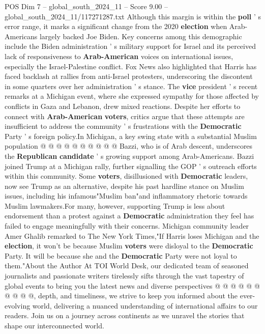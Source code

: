 \begin{textsample}{POS Dim 7 – global\_south\_2024\_11 – Score 9.00 – global\_south\_2024\_11/117271287.txt}
Although this margin is within the \textbf{poll} ' s error range, it marks a significant change from the 2020 \textbf{election} when Arab-Americans largely backed Joe Biden.
Key concerns among this demographic include the Biden administration ' s military support for Israel and its perceived lack of responsiveness to \textbf{Arab-American} voices on international issues, especially the Israel-Palestine conflict.
Fox News also highlighted that Harris has faced backlash at rallies from anti-Israel protesters, underscoring the discontent in some quarters over her administration ' s stance.
The \textbf{vice} president ' s recent remarks at a Michigan event, where she expressed sympathy for those affected by conflicts in Gaza and Lebanon, drew mixed reactions.
Despite her efforts to connect with \textbf{Arab-American} \textbf{voters}, critics argue that these attempts are insufficient to address the community ' s frustrations with the \textbf{Democratic} Party ' s foreign policy.In Michigan, a key swing state with a substantial Muslim population @ @ @ @ @ @ @ @ @ @ Bazzi, who is of Arab descent, underscores the \textbf{Republican} \textbf{candidate} ' s growing support among Arab-Americans.
Bazzi joined Trump at a Michigan rally, further signalling the GOP ' s outreach efforts within this community.
Some \textbf{voters}, disillusioned with \textbf{Democratic} leaders, now see Trump as an alternative, despite his past hardline stance on Muslim issues, including his infamous"Muslim ban"and inflammatory rhetoric towards Muslim lawmakers.For many, however, supporting Trump is less about endorsement than a protest against a \textbf{Democratic} administration they feel has failed to engage meaningfully with their concerns.
Michigan community leader Amer Ghalib remarked to The New York Times,"If Harris loses Michigan and the \textbf{election}, it won't be because Muslim \textbf{voters} were disloyal to the \textbf{Democratic} Party.
It will be because she and the \textbf{Democratic} Party were not loyal to them."About the Author At TOI World Desk, our dedicated team of seasoned journalists and passionate writers tirelessly sifts through the vast tapestry of global events to bring you the latest news and diverse perspectives @ @ @ @ @ @ @ @ @ @, depth, and timeliness, we strive to keep you informed about the ever-evolving world, delivering a nuanced understanding of international affairs to our readers.
Join us on a journey across continents as we unravel the stories that shape our interconnected world.

\end{textsample}
